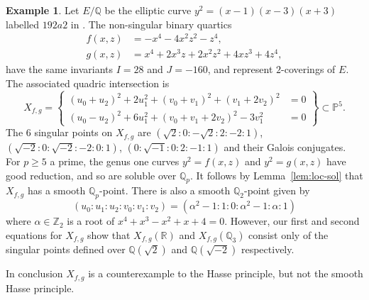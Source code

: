 \documentclass[12pt]{amsart}
\newcommand{\PP}{{\mathbb P}}
\newcommand{\R}{{\mathbb R}}
\newcommand{\Q}{{\mathbb Q}}
\newcommand{\Z}{{\mathbb Z}}
\theoremstyle{definition}
\newtheorem{Example}[Proposition]{Example}
\begin{document}
\begin{Example}
  \label{ex:hpfails}
  Let $E/\Q$ be the elliptic curve $y^2 = (x-1)(x-3)(x+3)$ 
  labelled $192a2$ in \cite{CrTables}.
  The non-singular binary quartics
  \begin{align*}
    f(x,z) &= -x^4 - 4 x^2 z^2 - z^4, \\
    g(x,z) &= x^4 + 2 x^3 z + 2 x^2 z^2 + 4 x z^3 + 4 z^4,
  \end{align*} have the same invariants $I = 28$ and $J = -160$,
  and represent $2$-coverings of $E$.
  The associated quadric intersection is 
  \[ X_{f,g} = \left\{ \begin{aligned} 
    (u_0 + u_2)^2 + 2 u_1^2 + (v_0 + v_1)^2 + (v_1 + 2 v_2)^2 &= 0\\
    (u_0 - u_2)^2 + 6 u_1^2 + (v_0+v_1+2 v_2)^2 - 3 v_1^2 &= 0
                       \end{aligned} \right\} \subset \PP^5. \]
The $6$ singular points on $X_{f,g}$ are
$(\sqrt{2} : 0 : -\sqrt{2} : 2 : -2 : 1)$,
$(\sqrt{-2} : 0 : \sqrt{-2} : -2 : 0 : 1 )$,
$(0 : \sqrt{-1} : 0 : 2 : -1 : 1)$
and their Galois conjugates.
For $p \geqslant 5$ a prime, the genus one curves
$y^2 = f(x,z)$ and $y^2 = g(x,z)$
have good reduction, and so are soluble over $\Q_p$.
It follows by Lemma~\ref{lem:loc-sol}
that $X_{f,g}$ has a smooth $\Q_p$-point. There is also a smooth
$\Q_2$-point given by \[ (u_0:u_1:u_2:v_0:v_1:v_2)
  = ( \alpha^2 - 1: 1: 0: \alpha^2 - 1: \alpha: 1)\]
where $\alpha \in \Z_2$ is a root of $x^4 + x^3 - x^2 + x + 4 = 0$.
However, our first and second equations for $X_{f,g}$ show that
$X_{f,g}(\R)$ and $X_{f,g}(\Q_3)$ consist only of
the singular points defined over $\Q(\sqrt{2})$ and $\Q(\sqrt{-2})$
respectively.

In conclusion $X_{f,g}$ is a counterexample to the Hasse principle,
but not the smooth Hasse principle.
\end{Example}
\end{document}
